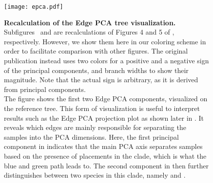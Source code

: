 \begin{figure}[hpbt]
    \centering
    \vspace*{1em}
    \texttt{[image: epca.pdf]}
    \vspace*{-1em}
    \begin{subfigure}{0pt}
        \label{fig:epca:sub:comp1}
    \end{subfigure}
    \begin{subfigure}{0pt}
        \label{fig:epca:sub:comp2}
    \end{subfigure}
    \caption[Recalculation of the Edge PCA tree visualization]{
        \textbf{Recalculation of the Edge PCA tree visualization.}
        Subfigures~ and  are recalculations
        of Figures 4 and 5 of , respectively.
        However, we show them here in our coloring scheme in order to facilitate comparison with other figures.
        The original publication instead uses two colors for a positive and a negative sign of the principal components,
        and branch widths to show their magnitude.
        Note that the actual sign is arbitrary, as it is derived from principal components.
        \\
        The figure shows the first two Edge PCA components, visualized on the reference tree.
        This form of visualization is useful to interpret results such as the Edge PCA projection plot
        as shown later in .
        It reveals which edges are mainly responsible for separating the samples into the PCA dimensions.
        Here, the first principal component in  indicates that the main PCA axis
        separates samples based on the presence of placements in the  clade,
        which is what the blue and green path leads to.
        The second component in  then further distinguishes between two species
        in this clade, namely  and .
    }
    \label{fig:epca}
\end{figure}


